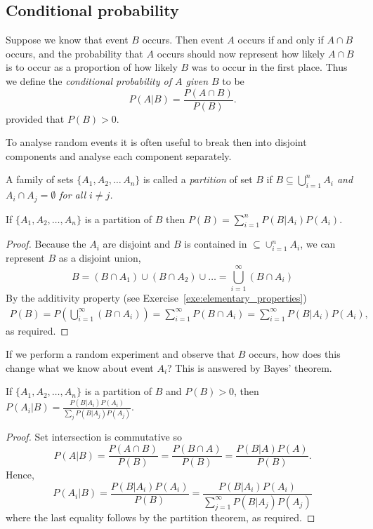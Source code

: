 \subsection{Conditional probability}

Suppose we know that event $B$ occurs. Then event $A$ occurs if and only if $A\cap B$ occurs, and the probability that $A$ occurs should now represent how likely $A\cap B$ is to occur as a proportion of how likely $B$ was to occur in the first place. Thus we define the \emph{conditional probability of $A$ given $B$} to be
\[
P(A|B) = \frac{P(A\cap B)}{P(B)}.
\] 
provided that $P(B)>0$. 

To analyse random events it is often useful to break then into disjoint components and analyse each component separately.
\begin{definition}
A family of sets $\{A_1,A_2,\ldots\,A_n\}$ is called a \emph{partition} of set $B$ if 
\ben
\it $B \subseteq \bigcup_{i=1}^{n} A_i$ and
\it $A_i\cap A_j = \emptyset$ for all $i\neq j$.
\een
\end{definition}

\begin{theorem}\label{thm:partition}
If $\{A_1,A_2,\ldots,A_n\}$ is a partition of $B$ then 
$
P(B) = \sum_{i=1}^{n} P(B|A_i)P(A_i).
$
\begin{proof}
Because the $A_i$ are disjoint and $B$ is contained in $\subseteq\cup_{i=1}^{n}A_i$, we can represent $B$ as a disjoint union,
\[
B = (B\cap A_1)\cup (B\cap A_2)\cup \ldots = \bigcup_{i=1}^{\infty}(B\cap A_i)
\]
By the additivity property (see Exercise~\ref{exe:elementary_properties})
\begin{align*}
P(B)
	= P\left(\bigcup_{i=1}^{\infty}(B\cap A_i)\right)
	= \sum_{i=1}^{\infty}P(B\cap A_i)
	= \sum_{i=1}^{\infty}P(B|A_i)P(A_i),
\end{align*}
as required.
\end{proof}
\end{theorem}

If we perform a random experiment and observe that $B$ occurs, how does this change what we know about event $A_i$? This is answered by Bayes' theorem.

\begin{theorem}\label{thm:bayes}
If $\{A_1,A_2,\ldots,A_n\}$ is a partition of $B$ and $P(B)>0$, then
$
P(A_i|B) = \displaystyle\frac{P(B|A_i)P(A_i)}{\sum_j P(B|A_j)P(A_j)}.
$
\begin{proof}
Set intersection is commutative so
\[
P(A|B) = \frac{P(A\cap B)}{P(B)} = \frac{P(B\cap A)}{P(B)} = \frac{P(B|A)P(A)}{P(B)}.
\]
Hence,
\[
P(A_i|B) 
	= \frac{P(B|A_i)P(A_i)}{P(B)}
	= \frac{P(B|A_i)P(A_i)}{\sum_{j=1}^{\infty} P(B|A_j)P(A_j)}
\]
where the last equality follows by the partition theorem, as required.
\end{proof}
\end{theorem}

